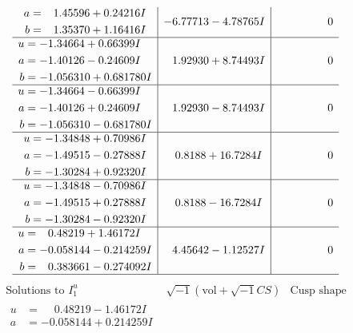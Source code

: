 \documentclass[1p]{elsarticle_modified}
\theoremstyle{definition}
\newcommand{\I}{\sqrt{-1}}
\begin{document}
$$\begin{array}{c|c|c}
\begin{aligned}
a &= \phantom{-}1.45596 + 0.24216 I \\
b &= \phantom{-}1.35370 + 1.16416 I\end{aligned}
 & -6.77713 - 4.78765 I & \phantom{-0.000000 } 0 \\ \hline\begin{aligned}
u &= -1.34664 + 0.66399 I \\
a &= -1.40126 - 0.24609 I \\
b &= -1.056310 + 0.681780 I\end{aligned}
 & \phantom{-}1.92930 + 8.74493 I & \phantom{-0.000000 } 0 \\ \hline\begin{aligned}
u &= -1.34664 - 0.66399 I \\
a &= -1.40126 + 0.24609 I \\
b &= -1.056310 - 0.681780 I\end{aligned}
 & \phantom{-}1.92930 - 8.74493 I & \phantom{-0.000000 } 0 \\ \hline\begin{aligned}
u &= -1.34848 + 0.70986 I \\
a &= -1.49515 - 0.27888 I \\
b &= -1.30284 + 0.92320 I\end{aligned}
 & \phantom{-}0.8188 + 16.7284 I & \phantom{-0.000000 } 0 \\ \hline\begin{aligned}
u &= -1.34848 - 0.70986 I \\
a &= -1.49515 + 0.27888 I \\
b &= -1.30284 - 0.92320 I\end{aligned}
 & \phantom{-}0.8188 - 16.7284 I & \phantom{-0.000000 } 0 \\ \hline\begin{aligned}
u &= \phantom{-}0.48219 + 1.46172 I \\
a &= -0.058144 - 0.214259 I \\
b &= \phantom{-}0.383661 - 0.274092 I\end{aligned}
 & \phantom{-}4.45642 - 1.12527 I & \phantom{-0.000000 } 0\\
 \hline 
 \end{array}$$\newpage$$\begin{array}{c|c|c}  
\text{Solutions to }I^u_{1}& \I (\text{vol} + \sqrt{-1}CS) & \text{Cusp shape}\\
 \hline 
\begin{aligned}
u &= \phantom{-}0.48219 - 1.46172 I \\
a &= -0.058144 + 0.214259 I \\

\end{aligned}
\end{array}$$
\end{document}
